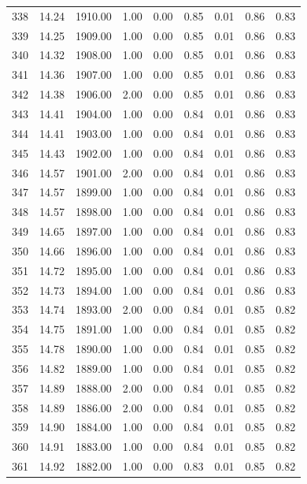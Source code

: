 \documentclass{article}\usepackage[]{graphicx}\usepackage[]{color}
\begin{document}
\begin{longtable}{rrrrrrrrr}
  338 & 14.24 & 1910.00 & 1.00 & 0.00 & 0.85 & 0.01 & 0.86 & 0.83 \\ 
  339 & 14.25 & 1909.00 & 1.00 & 0.00 & 0.85 & 0.01 & 0.86 & 0.83 \\ 
  340 & 14.32 & 1908.00 & 1.00 & 0.00 & 0.85 & 0.01 & 0.86 & 0.83 \\ 
  341 & 14.36 & 1907.00 & 1.00 & 0.00 & 0.85 & 0.01 & 0.86 & 0.83 \\ 
  342 & 14.38 & 1906.00 & 2.00 & 0.00 & 0.85 & 0.01 & 0.86 & 0.83 \\ 
  343 & 14.41 & 1904.00 & 1.00 & 0.00 & 0.84 & 0.01 & 0.86 & 0.83 \\ 
  344 & 14.41 & 1903.00 & 1.00 & 0.00 & 0.84 & 0.01 & 0.86 & 0.83 \\ 
  345 & 14.43 & 1902.00 & 1.00 & 0.00 & 0.84 & 0.01 & 0.86 & 0.83 \\ 
  346 & 14.57 & 1901.00 & 2.00 & 0.00 & 0.84 & 0.01 & 0.86 & 0.83 \\ 
  347 & 14.57 & 1899.00 & 1.00 & 0.00 & 0.84 & 0.01 & 0.86 & 0.83 \\ 
  348 & 14.57 & 1898.00 & 1.00 & 0.00 & 0.84 & 0.01 & 0.86 & 0.83 \\ 
  349 & 14.65 & 1897.00 & 1.00 & 0.00 & 0.84 & 0.01 & 0.86 & 0.83 \\ 
  350 & 14.66 & 1896.00 & 1.00 & 0.00 & 0.84 & 0.01 & 0.86 & 0.83 \\ 
  351 & 14.72 & 1895.00 & 1.00 & 0.00 & 0.84 & 0.01 & 0.86 & 0.83 \\ 
  352 & 14.73 & 1894.00 & 1.00 & 0.00 & 0.84 & 0.01 & 0.86 & 0.83 \\ 
  353 & 14.74 & 1893.00 & 2.00 & 0.00 & 0.84 & 0.01 & 0.85 & 0.82 \\ 
  354 & 14.75 & 1891.00 & 1.00 & 0.00 & 0.84 & 0.01 & 0.85 & 0.82 \\ 
  355 & 14.78 & 1890.00 & 1.00 & 0.00 & 0.84 & 0.01 & 0.85 & 0.82 \\ 
  356 & 14.82 & 1889.00 & 1.00 & 0.00 & 0.84 & 0.01 & 0.85 & 0.82 \\ 
  357 & 14.89 & 1888.00 & 2.00 & 0.00 & 0.84 & 0.01 & 0.85 & 0.82 \\ 
  358 & 14.89 & 1886.00 & 2.00 & 0.00 & 0.84 & 0.01 & 0.85 & 0.82 \\ 
  359 & 14.90 & 1884.00 & 1.00 & 0.00 & 0.84 & 0.01 & 0.85 & 0.82 \\ 
  360 & 14.91 & 1883.00 & 1.00 & 0.00 & 0.84 & 0.01 & 0.85 & 0.82 \\ 
  361 & 14.92 & 1882.00 & 1.00 & 0.00 & 0.83 & 0.01 & 0.85 & 0.82 \\ 

\end{longtable}
\end{document}
